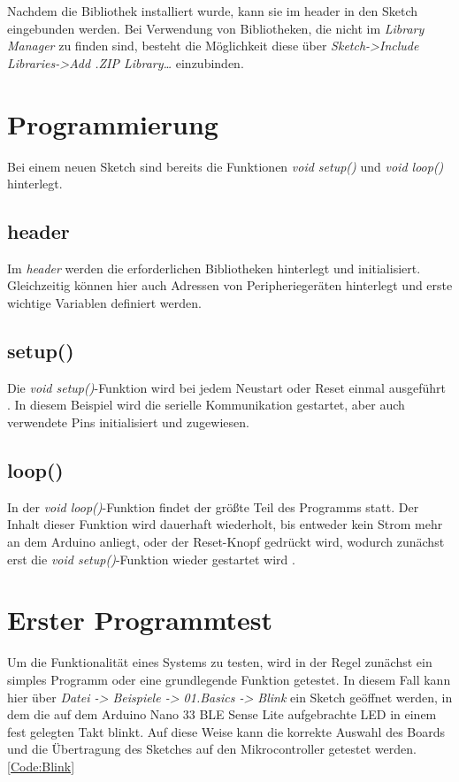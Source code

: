Nachdem die Bibliothek installiert wurde, kann sie im header in den Sketch eingebunden werden.
Bei Verwendung von Bibliotheken, die nicht im \textit{Library Manager} zu finden sind, besteht die Möglichkeit diese über \textit{Sketch->Include Libraries->Add .ZIP Library…} einzubinden.

\section{Programmierung}
Bei einem neuen Sketch sind bereits die Funktionen \textit{void setup()} und \textit{void loop()} hinterlegt.

\subsection{header}
Im \textit{header} werden die erforderlichen Bibliotheken hinterlegt und initialisiert. Gleichzeitig können hier auch Adressen von Peripheriegeräten hinterlegt und erste wichtige Variablen definiert werden.

\subsection{setup()}
Die \textit{void setup()}-Funktion wird bei jedem Neustart oder Reset einmal ausgeführt \cite{ArdIDE.2024d}.
In diesem Beispiel wird die serielle Kommunikation gestartet, aber auch verwendete Pins initialisiert und zugewiesen.

\subsection{loop()}
In der \textit{void loop()}-Funktion findet der größte Teil des Programms statt. Der Inhalt dieser Funktion wird dauerhaft wiederholt, bis entweder kein Strom mehr an dem Arduino anliegt, oder der Reset-Knopf gedrückt wird, wodurch zunächst erst die \textit{void setup()}-Funktion wieder gestartet wird \cite{ArdIDE.2024e}.

\section{Erster Programmtest}
Um die Funktionalität eines Systems zu testen, wird in der Regel zunächst ein simples Programm oder eine grundlegende Funktion getestet.
In diesem Fall kann hier über \textit{Datei -> Beispiele -> 01.Basics -> Blink} ein Sketch geöffnet werden, in dem die auf dem Arduino Nano 33 BLE Sense Lite aufgebrachte LED in einem fest gelegten Takt blinkt. Auf diese Weise kann die korrekte Auswahl des Boards und die Übertragung des Sketches auf den Mikrocontroller getestet werden.
\ref{Code:Blink}

